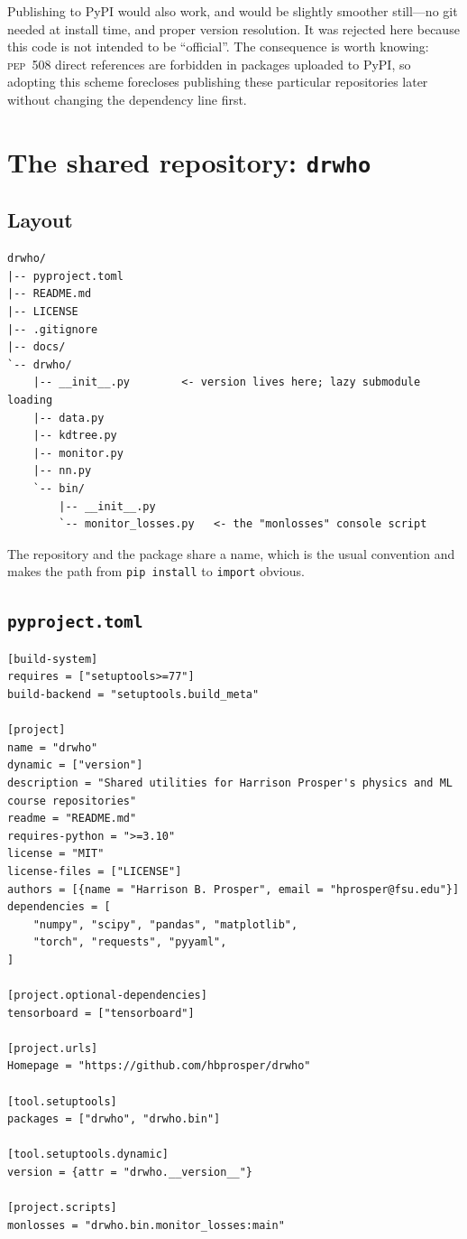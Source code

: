 \documentclass[11pt,a4paper]{article}
\begin{document}
\begin{notebox}
Publishing to PyPI would also work, and would be slightly smoother still---no
git needed at install time, and proper version resolution. It was rejected here
because this code is not intended to be ``official''. The consequence is worth
knowing: \textsc{pep}~508 direct references are forbidden in packages uploaded to
PyPI, so adopting this scheme forecloses publishing these particular
repositories later without changing the dependency line first.
\end{notebox}

\section{The shared repository: \texttt{drwho}}

\subsection{Layout}

\begin{lstlisting}[style=plain]
drwho/
|-- pyproject.toml
|-- README.md
|-- LICENSE
|-- .gitignore
|-- docs/
`-- drwho/
    |-- __init__.py        <- version lives here; lazy submodule loading
    |-- data.py
    |-- kdtree.py
    |-- monitor.py
    |-- nn.py
    `-- bin/
        |-- __init__.py
        `-- monitor_losses.py   <- the "monlosses" console script
\end{lstlisting}

The repository and the package share a name, which is the usual convention and
makes the path from \texttt{pip install} to \texttt{import} obvious.

\subsection{\texttt{pyproject.toml}}

\begin{lstlisting}[style=tomlst]
[build-system]
requires = ["setuptools>=77"]
build-backend = "setuptools.build_meta"

[project]
name = "drwho"
dynamic = ["version"]
description = "Shared utilities for Harrison Prosper's physics and ML course repositories"
readme = "README.md"
requires-python = ">=3.10"
license = "MIT"
license-files = ["LICENSE"]
authors = [{name = "Harrison B. Prosper", email = "hprosper@fsu.edu"}]
dependencies = [
    "numpy", "scipy", "pandas", "matplotlib",
    "torch", "requests", "pyyaml",
]

[project.optional-dependencies]
tensorboard = ["tensorboard"]

[project.urls]
Homepage = "https://github.com/hbprosper/drwho"

[tool.setuptools]
packages = ["drwho", "drwho.bin"]

[tool.setuptools.dynamic]
version = {attr = "drwho.__version__"}

[project.scripts]
monlosses = "drwho.bin.monitor_losses:main"
\end{lstlisting}
\end{document}
